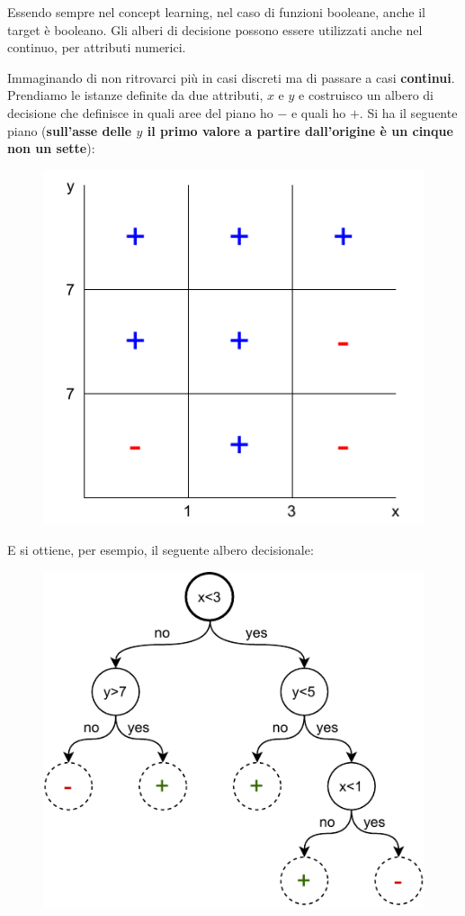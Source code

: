 Essendo sempre nel concept learning, nel caso di funzioni booleane, anche il
target è booleano.
Gli alberi di decisione possono essere utilizzati anche nel continuo, per attributi numerici.
\begin{esempio}
  Immaginando  di non ritrovarci più in casi discreti ma di passare a casi \textbf{continui}. Prendiamo le istanze definite da due attributi, $x$ e $y$ e costruisco un
  albero di decisione che definisce in quali aree del piano ho $-$ e quali ho
  $+$.
  \newpage
  Si ha il seguente piano (\textbf{sull'asse delle $y$ il primo valore a partire
  dall'origine è un cinque non un sette}): 
  \begin{figure}[H]
    \centering
     \includegraphics[scale = 0.8]{img/dt3.pdf}
  \end{figure}
  E si ottiene, per esempio, il seguente albero decisionale:
  \begin{figure}[H]
    \centering
    \includegraphics[scale = 0.9]{img/dt4.pdf}

\end{figure}
\end{esempio}
